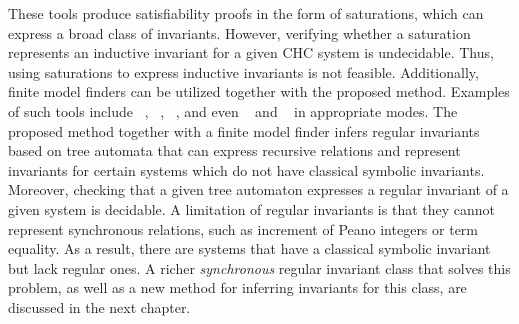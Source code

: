 These tools produce satisfiability proofs in the form of saturations, which can express a broad class of invariants. However, verifying whether a saturation represents an inductive invariant for a given CHC system is undecidable. Thus, using saturations to express inductive invariants is not feasible.
Additionally, finite model finders can be utilized together with the proposed method. Examples of such tools include \mace{}~\cite{https://doi.org/10.48550/arxiv.cs/0310055}, \kodkod{}~\cite{10.1007/978-3-540-71209-1_49}, \paradox{}~\cite{claessen2003new}, and even \cvc{}~\cite{reynolds2013finite} and \vampire{}~\cite{10.1007/978-3-319-40970-2_20} in appropriate modes. The proposed method together with a finite model finder infers regular invariants based on tree automata that can express recursive relations and represent invariants for certain systems which do not have classical symbolic invariants. Moreover, checking that a given tree automaton expresses a regular invariant of a given system is decidable.
A limitation of regular invariants is that they cannot represent synchronous relations, such as increment of Peano integers or term equality. As a result, there are systems that have a classical symbolic invariant but lack regular ones.
A richer \emph{synchronous} regular invariant class that solves this problem, as well as a new method for inferring invariants for this class, are discussed in the next chapter.
